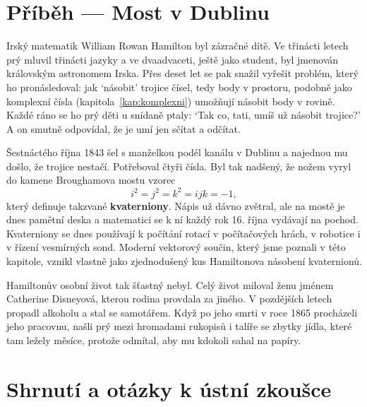 \section{Příběh --- Most v Dublinu}

Irský matematik William Rowan Hamilton byl zázračné dítě. Ve třinácti letech prý mluvil třinácti jazyky a ve dvaadvaceti, ještě jako student, byl jmenován královským astronomem Irska. Přes deset let se pak snažil vyřešit problém, který ho pronásledoval: jak `násobit' trojice čísel, tedy body v prostoru, podobně jako komplexní čísla (kapitola~\ref{kap:komplexni}) umožňují násobit body v rovině. Každé ráno se ho prý děti u snídaně ptaly: `Tak co, tati, umíš už násobit trojice?' A on smutně odpovídal, že je umí jen sčítat a odčítat.

Šestnáctého října 1843 šel s manželkou podél kanálu v Dublinu a najednou mu došlo, že trojice nestačí. Potřeboval čtyři čísla. Byl tak nadšený, že nožem vyryl do kamene Broughamova mostu vzorec
\begin{equation*}
  i^2 = j^2 = k^2 = ijk = -1,
\end{equation*}
který definuje takzvané \textbf{kvaterniony}. Nápis už dávno zvětral, ale na mostě je dnes pamětní deska a matematici se k ní každý rok 16. října vydávají na pochod. Kvaterniony se dnes používají k počítání rotací v počítačových hrách, v robotice i v řízení vesmírných sond. Moderní vektorový součin, který jsme poznali v této kapitole, vznikl vlastně jako zjednodušený kus Hamiltonova násobení kvaternionů.

Hamiltonův osobní život tak šťastný nebyl. Celý život miloval ženu jménem Catherine Disneyová, kterou rodina provdala za jiného. V pozdějších letech propadl alkoholu a stal se samotářem. Když po jeho smrti v roce 1865 procházeli jeho pracovnu, našli prý mezi hromadami rukopisů i talíře se zbytky jídla, které tam ležely měsíce, protože odmítal, aby mu kdokoli sahal na papíry.

\section{Shrnutí a otázky k ústní zkoušce}

